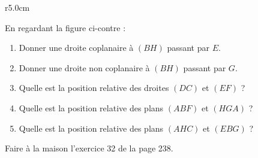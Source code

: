 
\begin{exercice}\label{exosmath-0079}

\begin{wrapfigure}{r}{5.0cm}
    \vspace{-0.8cm}
    \centering
    
\end{wrapfigure}

                En regardant la figure ci-contre :
        \begin{enumerate}
            \item
        Donner une droite coplanaire à \( (BH)\) passant par \( E\).
    \item
        Donner une droite non coplanaire à \( (BH)\) passant par \( G\).
    \item
        Quelle est la position relative des droites \( (DC)\) et \( (EF)\) ?
    \item
        Quelle est la position relative des plans \( (ABF)\) et \( (HGA)\) ?
    \item
        Quelle est la position relative des plans \( (AHC)\) et \( (EBG)\) ?
                
        \end{enumerate}

        Faire à la maison l'exercice 32 de la page 238.

\end{exercice}
